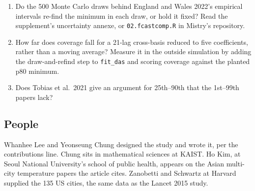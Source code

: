 \documentclass[11pt]{article}
\begin{document}
\begin{enumerate}[leftmargin=*]
\item Do the 500 Monte Carlo draws behind England and Wales 2022's empirical intervals re-find the minimum in each draw, or hold it fixed?
Read the supplement's uncertainty annexe, or \texttt{02.fcastcomp.R} in Mistry's repository.
\item How far does coverage fall for a 21-lag cross-basis reduced to five coefficients, rather than a moving average?
Measure it in the outside simulation by adding the draw-and-refind step to \texttt{fit\_das} and scoring coverage against the planted p80 minimum.
\item Does Tobias et al.\ 2021 give an argument for 25th--90th that the 1st--99th papers lack?
\end{enumerate}

\subsection*{People}

Whanhee Lee and Yeonseung Chung designed the study and wrote it, per the contributions line.
Chung sits in mathematical sciences at KAIST.
Ho Kim, at Seoul National University's school of public health, appears on the Asian multi-city temperature papers the article cites.
Zanobetti and Schwartz at Harvard supplied the 135 US cities, the same data as the Lancet 2015 study.
\end{document}
